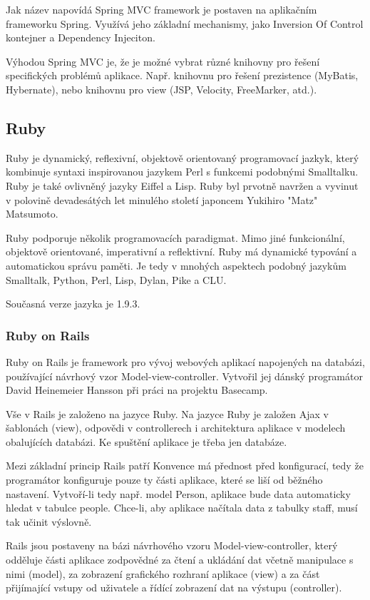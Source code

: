 Jak název napovídá Spring MVC framework je postaven na aplikačním frameworku Spring. Využívá jeho základní mechanismy, jako Inversion Of Control kontejner a Dependency Injeciton.

Výhodou Spring MVC je, že je možné vybrat různé knihovny pro řešení specifických problémů aplikace. Např. knihovnu pro řešení prezistence (MyBatis, Hybernate), nebo knihovnu pro view (JSP, Velocity, FreeMarker, atd.)\cite{liu2006research}.

\subsection{Ruby}
Ruby je dynamický, reflexivní, objektově orientovaný programovací jazkyk, který kombinuje syntaxi inspirovanou jazykem Perl s funkcemi podobnými Smalltalku. Ruby je také ovlivněný jazyky Eiffel a Lisp. Ruby byl prvotně navržen a vyvinut v polovině devadesátých let minulého století japoncem Yukihiro "Matz" Matsumoto.

Ruby podporuje několik programovacích paradigmat. Mimo jiné funkcionální, objektově orientované, imperativní a reflektivní. Ruby má dynamické typování a automatickou správu paměti. Je tedy v mnohých aspektech podobný jazykům Smalltalk, Python, Perl, Lisp, Dylan, Pike a CLU.

Současná verze jazyka je 1.9.3.
\subsubsection{Ruby on Rails}
Ruby on Rails je framework pro vývoj webových aplikací napojených na databázi, používající návrhový vzor Model-view-controller. Vytvořil jej dánský programátor David Heinemeier Hansson při práci na projektu Basecamp.

Vše v Rails je založeno na jazyce Ruby. Na jazyce Ruby je založen Ajax v šablonách (view), odpovědi v controllerech i architektura aplikace v modelech obalujících databázi. Ke spuštění aplikace je třeba jen databáze.

Mezi základní princip Rails patří Konvence má přednost před konfigurací, tedy že programátor konfiguruje pouze ty části aplikace, které se liší od běžného nastavení. Vytvoří-li tedy např. model Person, aplikace bude data automaticky hledat v tabulce people. Chce-li, aby aplikace načítala data z tabulky staff, musí tak učinit výslovně.

Rails jsou postaveny na bázi návrhového vzoru Model-view-controller, který odděluje části aplikace zodpovědné za čtení a ukládání dat včetně manipulace s nimi (model), za zobrazení grafického rozhraní aplikace (view) a za část přijímající vstupy od uživatele a řídící zobrazení dat na výstupu (controller).

